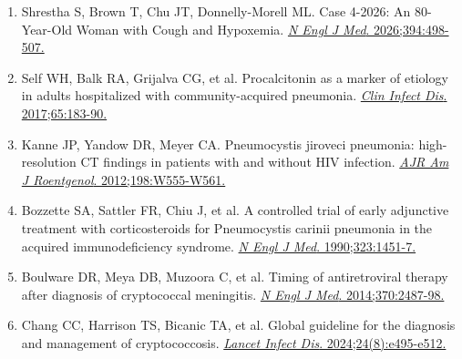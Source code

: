 \documentclass[12pt,a4paper]{article}
\begin{document}
\begin{enumerate}
    \item Shrestha S, Brown T, Chu JT, Donnelly-Morell ML. Case 4-2026: An 80-Year-Old Woman with Cough and Hypoxemia. \href{https://doi.org/10.1056/NEJMcpc2513543}{\textit{N Engl J Med}. 2026;394:498-507.}

    \item Self WH, Balk RA, Grijalva CG, et al. Procalcitonin as a marker of etiology in adults hospitalized with community-acquired pneumonia. \href{https://doi.org/10.1093/cid/cix317}{\textit{Clin Infect Dis}. 2017;65:183-90.}

    \item Kanne JP, Yandow DR, Meyer CA. Pneumocystis jiroveci pneumonia: high-resolution CT findings in patients with and without HIV infection. \href{https://doi.org/10.2214/AJR.11.7329}{\textit{AJR Am J Roentgenol}. 2012;198:W555-W561.}

    \item Bozzette SA, Sattler FR, Chiu J, et al. A controlled trial of early adjunctive treatment with corticosteroids for Pneumocystis carinii pneumonia in the acquired immunodeficiency syndrome. \href{https://doi.org/10.1056/NEJM199011223232103}{\textit{N Engl J Med}. 1990;323:1451-7.}

    \item Boulware DR, Meya DB, Muzoora C, et al. Timing of antiretroviral therapy after diagnosis of cryptococcal meningitis. \href{https://doi.org/10.1056/NEJMoa1312884}{\textit{N Engl J Med}. 2014;370:2487-98.}

    \item Chang CC, Harrison TS, Bicanic TA, et al. Global guideline for the diagnosis and management of cryptococcosis. \href{https://doi.org/10.1016/S1473-3099(24)00127-3}{\textit{Lancet Infect Dis}. 2024;24(8):e495-e512.}
\end{enumerate}
\end{document}
